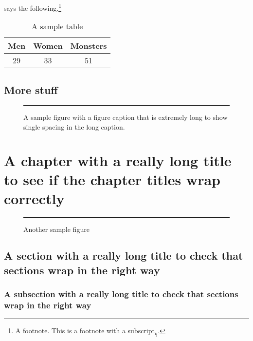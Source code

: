 \documentclass[lscape]{msu-thesis}
\begin{document}
\lipsum[1]
\lipsum[2]\cite{munn1999} says the following.\footnote{A footnote. This is a footnote with a subscript$_{\text{i}_{\text{j}}}$.  \lipsum[9]} \lipsum[2]
\begin{table}
\centering
\begin{tabular}{ccc}
\toprule
Men & Women & Monsters\\
\midrule
29 & 33 & 51\\
\bottomrule
\end{tabular}
\caption{A sample table}
\end{table}

\lipsum[3]
\section{More stuff}
\lipsum[4]\cite{munn2005}
\begin{figure}
\centering
{\color{gray!40}\rule{2in}{3in}}
\caption[A sample figure]{A sample figure with a figure caption that is extremely long to show single spacing in the long caption.}
\end{figure}
\lipsum[5]
\lipsum[10]
\chapter{A chapter with a really long title to see if the chapter titles wrap correctly}
\lipsum
\begin{figure}
\centering
{\color{gray!40}\rule{4in}{2in}}
\caption{Another sample figure}
\end{figure}
\lipsum[6]
\section{A section with a really long title to check that sections wrap in the right way}
\subsection{A subsection with a really long title to check that sections wrap in the right way}
\end{document}
